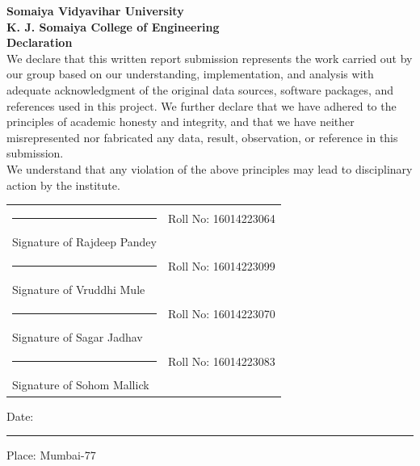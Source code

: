 \documentclass[12pt,a4paper]{report}
\begin{document}
\begin{titlepage}
    \centering
    {\Large \textbf{Somaiya Vidyavihar University}}\\[0.2cm]
    {\Large \textbf{K. J. Somaiya College of Engineering}}\\[1.2cm]
    {\Large \textbf{Declaration}}\\[1cm]

    We declare that this written report submission represents the work carried out by our group based on our understanding, implementation, and analysis with adequate acknowledgment of the original data sources, software packages, and references used in this project. We further declare that we have adhered to the principles of academic honesty and integrity, and that we have neither misrepresented nor fabricated any data, result, observation, or reference in this submission.\\[0.8cm]

    We understand that any violation of the above principles may lead to disciplinary action by the institute.\\[1.6cm]

    \begin{tabular}{p{7cm}p{5cm}}
        \rule{6cm}{0.4pt} & Roll No: 16014223064 \\
        Signature of Rajdeep Pandey & \\[0.6cm]
        \rule{6cm}{0.4pt} & Roll No: 16014223099 \\
        Signature of Vruddhi Mule & \\[0.6cm]
        \rule{6cm}{0.4pt} & Roll No: 16014223070 \\
        Signature of Sagar Jadhav & \\[0.6cm]
        \rule{6cm}{0.4pt} & Roll No: 16014223083 \\
        Signature of Sohom Mallick & \\
    \end{tabular}

    \vfill
    Date: \rule{4cm}{0.4pt} \hfill Place: Mumbai-77
\end{titlepage}
\end{document}
